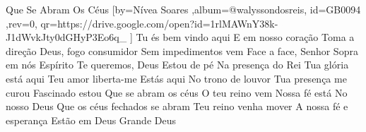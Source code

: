 \beginsong
{Que Se Abram Os Céus %
}[by={Nívea Soares %
},album={@walyssondosreis},
id={GB0094 %
},rev={0}, %
qr={https://drive.google.com/open?id=1rlMAWnY38k-J1dWvkJty0dGHyP3Eo6q_ %
}]
\beginverse*
Tu és bem vindo aqui
E em nosso coração
Toma a direção
\endverse
\beginverse*
Deus, fogo consumidor
Sem impedimentos vem
Face a face, Senhor
\endverse
\beginverse*
Sopra em nós
Espírito
Te queremos, Deus
\endverse
\beginverse*
Estou de pé
Na presença do Rei
Tua glória está aqui
Teu amor liberta-me
\endverse
\beginverse*
Estás aqui
No trono de louvor
Tua presença me curou
Fascinado estou
\endverse
\beginchorus
Que se abram os céus
O teu reino vem
Nossa fé está
No nosso Deus
\endchorus
\beginverse*
Que os céus fechados se abram
Teu reino venha mover
A nossa fé e esperança
Estão em Deus
Grande Deus
\endverse

\begin{comment}
\lstset{basicstyle=\scriptsize\bf} %
\tab{Solo 1}
\begin{lstlisting}
E|-----------------------------------------------------|
B|-----------------------------------------------------|
G|-----------------------------------------------------|
D|-----------------------------------------------------|
A|-----------------------------------------------------|
E|-----------------------------------------------------|
\end{lstlisting}
\end{comment}
 
